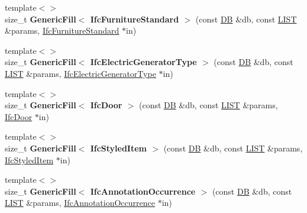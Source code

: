 \begin{DoxyCompactItemize}
\item 
\hypertarget{namespace_assimp_1_1_s_t_e_p_a37619d5f75e877ba494ff5606f1fc33f}{{\footnotesize template$<$$>$ }\\size\+\_\+t {\bfseries Generic\+Fill$<$ Ifc\+Furniture\+Standard $>$} (const \hyperlink{class_assimp_1_1_s_t_e_p_1_1_d_b}{D\+B} \&db, const \hyperlink{class_assimp_1_1_s_t_e_p_1_1_e_x_p_r_e_s_s_1_1_l_i_s_t}{L\+I\+S\+T} \&params, \hyperlink{struct_assimp_1_1_i_f_c_1_1_ifc_furniture_standard}{Ifc\+Furniture\+Standard} $\ast$in)}\label{namespace_assimp_1_1_s_t_e_p_a37619d5f75e877ba494ff5606f1fc33f}

\item 
\hypertarget{namespace_assimp_1_1_s_t_e_p_a165f8b0210228ae433dc1a576c27d6e0}{{\footnotesize template$<$$>$ }\\size\+\_\+t {\bfseries Generic\+Fill$<$ Ifc\+Electric\+Generator\+Type $>$} (const \hyperlink{class_assimp_1_1_s_t_e_p_1_1_d_b}{D\+B} \&db, const \hyperlink{class_assimp_1_1_s_t_e_p_1_1_e_x_p_r_e_s_s_1_1_l_i_s_t}{L\+I\+S\+T} \&params, \hyperlink{struct_assimp_1_1_i_f_c_1_1_ifc_electric_generator_type}{Ifc\+Electric\+Generator\+Type} $\ast$in)}\label{namespace_assimp_1_1_s_t_e_p_a165f8b0210228ae433dc1a576c27d6e0}

\item 
\hypertarget{namespace_assimp_1_1_s_t_e_p_a9332e26088cdff8afc5f0622569fa7cd}{{\footnotesize template$<$$>$ }\\size\+\_\+t {\bfseries Generic\+Fill$<$ Ifc\+Door $>$} (const \hyperlink{class_assimp_1_1_s_t_e_p_1_1_d_b}{D\+B} \&db, const \hyperlink{class_assimp_1_1_s_t_e_p_1_1_e_x_p_r_e_s_s_1_1_l_i_s_t}{L\+I\+S\+T} \&params, \hyperlink{struct_assimp_1_1_i_f_c_1_1_ifc_door}{Ifc\+Door} $\ast$in)}\label{namespace_assimp_1_1_s_t_e_p_a9332e26088cdff8afc5f0622569fa7cd}

\item 
\hypertarget{namespace_assimp_1_1_s_t_e_p_a405d1217436256d56eff466e0cf6a821}{{\footnotesize template$<$$>$ }\\size\+\_\+t {\bfseries Generic\+Fill$<$ Ifc\+Styled\+Item $>$} (const \hyperlink{class_assimp_1_1_s_t_e_p_1_1_d_b}{D\+B} \&db, const \hyperlink{class_assimp_1_1_s_t_e_p_1_1_e_x_p_r_e_s_s_1_1_l_i_s_t}{L\+I\+S\+T} \&params, \hyperlink{struct_assimp_1_1_i_f_c_1_1_ifc_styled_item}{Ifc\+Styled\+Item} $\ast$in)}\label{namespace_assimp_1_1_s_t_e_p_a405d1217436256d56eff466e0cf6a821}

\item 
\hypertarget{namespace_assimp_1_1_s_t_e_p_ac3bbe91fcac908b3d3ffc4b5cf711816}{{\footnotesize template$<$$>$ }\\size\+\_\+t {\bfseries Generic\+Fill$<$ Ifc\+Annotation\+Occurrence $>$} (const \hyperlink{class_assimp_1_1_s_t_e_p_1_1_d_b}{D\+B} \&db, const \hyperlink{class_assimp_1_1_s_t_e_p_1_1_e_x_p_r_e_s_s_1_1_l_i_s_t}{L\+I\+S\+T} \&params, \hyperlink{struct_assimp_1_1_i_f_c_1_1_ifc_annotation_occurrence}{Ifc\+Annotation\+Occurrence} $\ast$in)}\label{namespace_assimp_1_1_s_t_e_p_ac3bbe91fcac908b3d3ffc4b5cf711816}


\end{DoxyCompactItemize}
